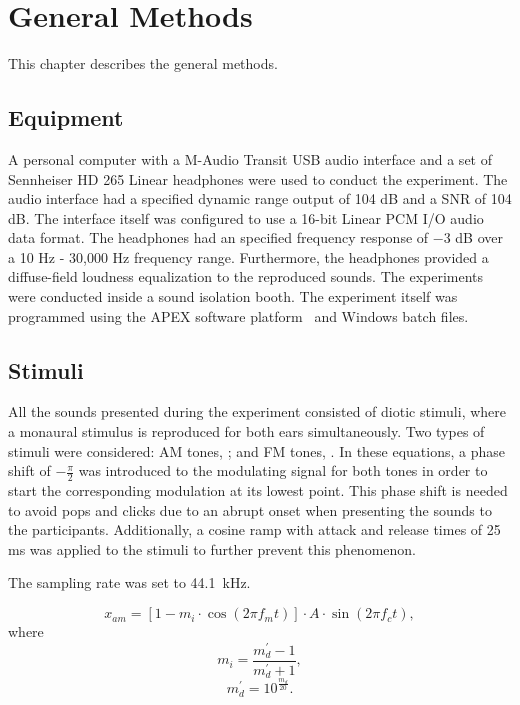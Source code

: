 \documentclass[../main.tex]{subfiles}
\begin{document}
\chapter{General Methods}
\label{cha:methods}

This chapter describes the general methods.

\section{Equipment}

A personal computer with a M-Audio Transit USB audio interface
\cite{maudio:transitusb} and a set of Sennheiser HD 265 Linear headphones
\cite{sennheiser:hd265linear} were used to conduct the experiment. The audio
interface had a specified dynamic range output of 104 dB and a \gls{SNR} of 104
dB. The interface itself was configured to use a 16-bit Linear \gls{PCM}
\gls{I/O} audio data format. The headphones had an specified frequency response
of $-3$ dB over a 10 Hz - 30,000 Hz frequency range. Furthermore, the headphones
provided a diffuse-field loudness equalization to the reproduced sounds. The
experiments were conducted inside a sound isolation booth. The experiment itself
was programmed using the APEX software platform~\cite{Francart2008} and Windows
batch files.

\section{Stimuli}
\label{sec:stimuli}

All the sounds presented during the experiment consisted of diotic stimuli,
where a monaural stimulus is reproduced for both ears simultaneously. Two
types of stimuli were considered: \gls{AM} tones, ; and \gls{FM}
tones, . In these equations, a phase shift of $-\frac{\pi}{2}$ was
introduced to the modulating signal for both tones in order to start the
corresponding modulation at its lowest point. This phase shift is needed to
avoid pops and clicks due to an abrupt onset when presenting the sounds to the
participants. Additionally, a cosine ramp with attack and release times of 25 ms
was applied to the stimuli to further prevent this phenomenon.

The
sampling rate was set to 44.1~kHz.

\begin{equation}
  x_{am} = [1 - m_i \cdot \cos(2 \pi f_m t)] \cdot A \cdot \sin(2 \pi f_c t),
  \label{eq:am}
\end{equation}
where
\begin{equation}
  m_i = \frac{m_d^{\prime}-1}{m_d^{\prime}+1},
\end{equation}
\begin{equation}
  m_d^{\prime} = 10^{\frac{m_d}{20}}.
\end{equation}
\end{document}
